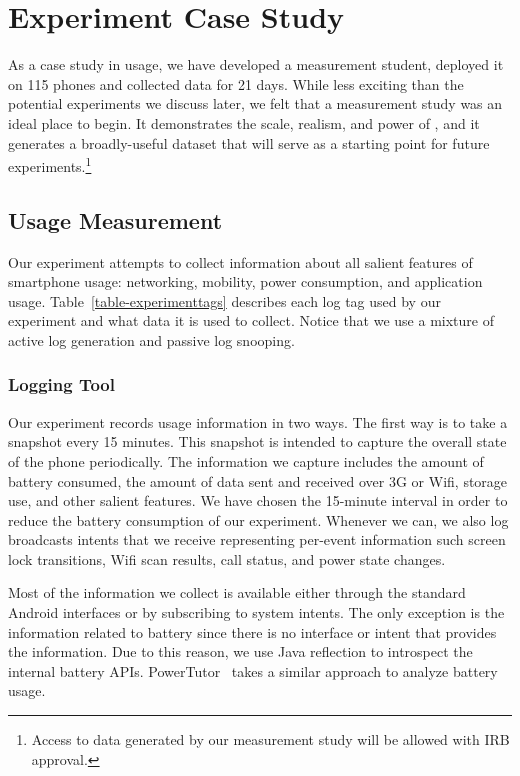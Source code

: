 \section{Experiment Case Study}
\label{sec-experiment}



As a case study in \PhoneLab{} usage, we have developed a measurement
student, deployed it on 115 phones and collected data for 21 days. While less
exciting than the potential experiments we discuss later, we felt that a
measurement study was an ideal place to begin. It demonstrates the scale,
realism, and power of \PhoneLab{}, and it generates a broadly-useful dataset
that will serve as a starting point for future experiments.\footnote{Access
to data generated by our measurement study will be allowed with IRB
approval.}

\subsection{Usage Measurement}

Our experiment attempts to collect information about all salient features of
smartphone usage: networking, mobility, power consumption, and application
usage. Table~\ref{table-experimenttags} describes each log tag used by our
experiment and what data it is used to collect. Notice that we use a mixture
of active log generation and passive log snooping.

\subsubsection{Logging Tool}

Our experiment records usage information in two ways. The first way is to
take a snapshot every 15 minutes. This snapshot is intended to capture the
overall state of the phone periodically. The information we capture includes
the amount of battery consumed, the amount of data sent and received over 3G
or Wifi, storage use, and other salient features. We have chosen the
15-minute interval in order to reduce the battery consumption of our
experiment. Whenever we can, we also log broadcasts intents that we receive
representing per-event information such screen lock transitions, Wifi scan
results, call status, and power state changes.

Most of the information we collect is available either through the standard
Android interfaces or by subscribing to system intents. The only exception is the
information related to battery since there is no interface or intent that provides
the information. Due to this reason, we use Java reflection to introspect the
internal battery APIs. PowerTutor~\cite{zhang:codes:2010} takes a similar
approach to analyze battery usage.

